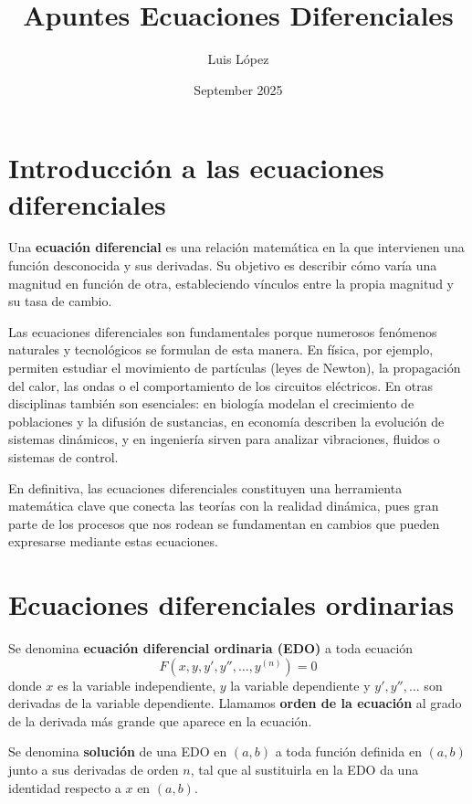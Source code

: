 \documentclass[a4paper,12pt]{article}
\title{Apuntes Ecuaciones Diferenciales}
\author{Luis López}
\date{September 2025}
\begin{document}
\maketitle %

\newpage %

\tableofcontents %
\newpage 

\section*{Introducción a las ecuaciones diferenciales}

Una \textbf{ecuación diferencial} es una relación matemática en la que intervienen una función desconocida y sus derivadas. 
Su objetivo es describir cómo varía una magnitud en función de otra, estableciendo vínculos entre la propia magnitud y su tasa de cambio.  

Las ecuaciones diferenciales son fundamentales porque numerosos fenómenos naturales y tecnológicos se formulan de esta manera. 
En física, por ejemplo, permiten estudiar el movimiento de partículas (leyes de Newton), la propagación del calor, las ondas o el comportamiento de los circuitos eléctricos. 
En otras disciplinas también son esenciales: en biología modelan el crecimiento de poblaciones y la difusión de sustancias, 
en economía describen la evolución de sistemas dinámicos, 
y en ingeniería sirven para analizar vibraciones, fluidos o sistemas de control.  

En definitiva, las ecuaciones diferenciales constituyen una herramienta matemática clave que conecta las teorías con la realidad dinámica, 
pues gran parte de los procesos que nos rodean se fundamentan en cambios que pueden expresarse mediante estas ecuaciones.

\newpage

\section{Ecuaciones diferenciales ordinarias}

Se denomina \textbf{ecuación diferencial ordinaria (EDO)} a toda ecuación
\[
F(x,y,y',y'',\ldots,y^{(n)}) = 0
\]
donde $x$ es la variable independiente, $y$ la variable dependiente y $y',y'',\ldots$ son derivadas de la variable dependiente.  
Llamamos \textbf{orden de la ecuación} al grado de la derivada más grande que aparece en la ecuación.  

Se denomina \textbf{solución} de una EDO en $(a,b)$ a toda función definida en $(a,b)$ junto a sus derivadas de orden $n$, tal que al sustituirla en la EDO da una identidad respecto a $x$ en $(a,b)$.  
\end{document}

